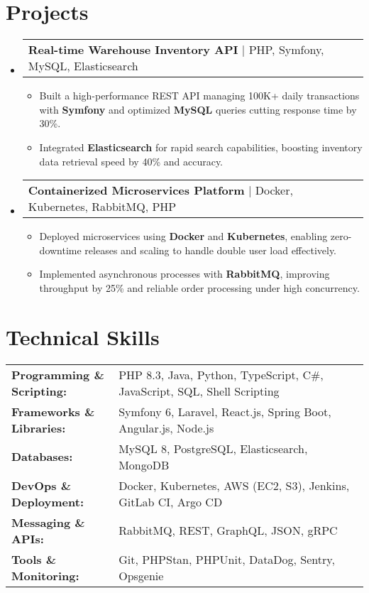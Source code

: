 \documentclass[letterpaper,11pt]{article}
\makeatletter
\newcommand{\resumeItem}[1]{
  \item\footnotesize{
    {#1 \vspace{-2pt}}
  }
}
\newcommand{\resumeProjectHeading}[2]{
    \item
    \begin{tabular*}{1.001\textwidth}{l@{\extracolsep{\fill}}r}
      \small#1 & \textbf{\small #2}\\
    \end{tabular*}\vspace{-7pt}
}
\newcommand{\resumeSubHeadingListStart}{\begin{itemize}[leftmargin=0pt, label={}]}
\newcommand{\resumeSubHeadingListEnd}{\end{itemize}}
\newcommand{\resumeItemListStart}{\begin{itemize}[leftmargin=*]}
\newcommand{\resumeItemListEnd}{\end{itemize}\vspace{-5pt}}
\makeatother
\begin{document}
\section{Projects}
    \vspace{-5pt}
    \resumeSubHeadingListStart
      \resumeProjectHeading
          {\textbf{Real-time Warehouse Inventory API} | PHP, Symfony, MySQL, Elasticsearch}{}
          \resumeItemListStart
              \resumeItem{Built a high-performance REST API managing 100K+ daily transactions with \textbf{Symfony} and optimized \textbf{MySQL} queries cutting response time by 30\%.}
              \resumeItem{Integrated \textbf{Elasticsearch} for rapid search capabilities, boosting inventory data retrieval speed by 40\% and accuracy.}
          \resumeItemListEnd
          \vspace{-16pt}
      \resumeProjectHeading
          {\textbf{Containerized Microservices Platform} | Docker, Kubernetes, RabbitMQ, PHP}{}
          \resumeItemListStart
              \resumeItem{Deployed microservices using \textbf{Docker} and \textbf{Kubernetes}, enabling zero-downtime releases and scaling to handle double user load effectively.}
              \resumeItem{Implemented asynchronous processes with \textbf{RabbitMQ}, improving throughput by 25\% and reliable order processing under high concurrency.}
          \resumeItemListEnd
    \resumeSubHeadingListEnd
\vspace{-10pt}
\section{Technical Skills}
        \vspace{-14pt}
        \begin{table}[h]
            \footnotesize
            \begin{tabular}{p{0.3\linewidth} p{0.7\linewidth}}
                \textbf{Programming \& Scripting:} & PHP 8.3, Java, Python, TypeScript, C\#, JavaScript, SQL, Shell Scripting \\
                \textbf{Frameworks \& Libraries:} & Symfony 6, Laravel, React.js, Spring Boot, Angular.js, Node.js \\
                \textbf{Databases:} & MySQL 8, PostgreSQL, Elasticsearch, MongoDB \\
                \textbf{DevOps \& Deployment:} & Docker, Kubernetes, AWS (EC2, S3), Jenkins, GitLab CI, Argo CD \\
                \textbf{Messaging \& APIs:} & RabbitMQ, REST, GraphQL, JSON, gRPC \\
                \textbf{Tools \& Monitoring:} & Git, PHPStan, PHPUnit, DataDog, Sentry, Opsgenie \\
            \end{tabular}
        \end{table}
\end{document}
